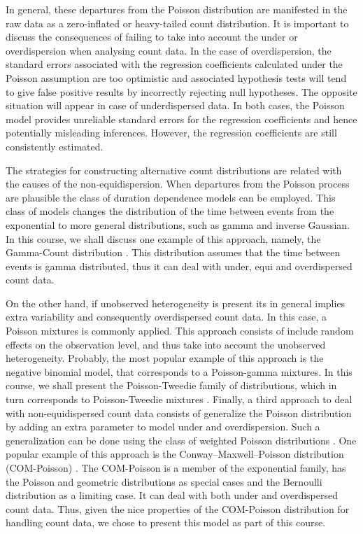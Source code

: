 \documentclass[9pt,a5paper,]{book}
\theoremstyle{definition}
\theoremstyle{definition}
\theoremstyle{remark}
\begin{document}
In general, these departures from the Poisson distribution are
manifested in the raw data as a zero-inflated or heavy-tailed count
distribution. It is important to discuss the consequences of failing to
take into account the under or overdispersion when analysing count data.
In the case of overdispersion, the standard errors associated with the
regression coefficients calculated under the Poisson assumption are too
optimistic and associated hypothesis tests will tend to give false
positive results by incorrectly rejecting null hypotheses. The opposite
situation will appear in case of underdispersed data. In both cases, the
Poisson model provides unreliable standard errors for the regression
coefficients and hence potentially misleading inferences. However, the
regression coefficients are still consistently estimated.

The strategies for constructing alternative count distributions are
related with the causes of the non-equidispersion. When departures from
the Poisson process are plausible the class of duration dependence
models \citep{Winkelmann2003} can be employed. This class of models
changes the distribution of the time between events from the exponential
to more general distributions, such as gamma and inverse Gaussian. In
this course, we shall discuss one example of this approach, namely, the
Gamma-Count distribution \citep{Zeviani2014}. This distribution assumes
that the time between events is gamma distributed, thus it can deal with
under, equi and overdispersed count data.

On the other hand, if unobserved heterogeneity is present its in general
implies extra variability and consequently overdispersed count data. In
this case, a Poisson mixtures is commonly applied. This approach
consists of include random effects on the observation level, and thus
take into account the unobserved heterogeneity. Probably, the most
popular example of this approach is the negative binomial model, that
corresponds to a Poisson-gamma mixtures. In this course, we shall
present the Poisson-Tweedie family of distributions, which in turn
corresponds to Poisson-Tweedie mixtures
\citep{Bonat2016b, Jorgensen2014}. Finally, a third approach to deal
with non-equidispersed count data consists of generalize the Poisson
distribution by adding an extra parameter to model under and
overdispersion. Such a generalization can be done using the class of
weighted Poisson distributions \citep{DelCastillo1998}. One popular
example of this approach is the Conway--Maxwell--Poisson distribution
(COM-Poisson) \citep{Sellers2010}. The COM-Poisson is a member of the
exponential family, has the Poisson and geometric distributions as
special cases and the Bernoulli distribution as a limiting case. It can
deal with both under and overdispersed count data. Thus, given the nice
properties of the COM-Poisson distribution for handling count data, we
chose to present this model as part of this course.
\end{document}
